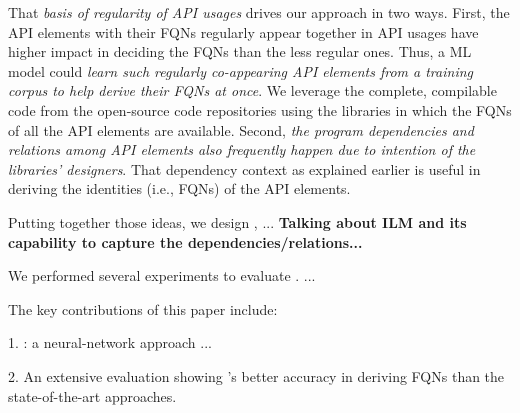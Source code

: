 That {\em basis of regularity of API usages} drives our approach in
two ways. First, the API elements with their FQNs regularly appear
together in API usages have higher impact in deciding the FQNs than
the less regular ones. Thus, a ML model could {\em learn such
  regularly co-appearing API elements from a training corpus to help
  derive their FQNs at once}. We leverage the complete, compilable
code from the open-source code repositories using the libraries in
which the FQNs of all the API elements are available. Second, {\em the
  program dependencies and relations among API elements also
  frequently happen due to intention of the libraries' designers}.
That dependency context as explained earlier is useful in deriving the
identities (i.e., FQNs) of the API elements.


Putting together those ideas, we design {\tool}, ...  {\bf Talking
  about ILM and its capability to capture the
  dependencies/relations...}

We performed several experiments to evaluate {\tool}. ...

The key contributions of this paper include:

1. {\tool}: a neural-network approach ...

2. An extensive evaluation showing {\tool}'s better accuracy in
deriving FQNs than the state-of-the-art approaches.


